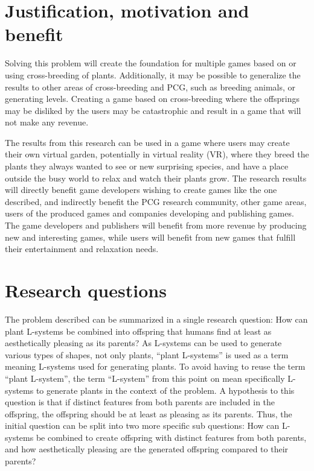 \section{Justification, motivation and benefit}
Solving this problem will create the foundation for multiple games based on or using cross-breeding of plants.
Additionally, it may be possible to generalize the results to other areas of cross-breeding and PCG, such as breeding animals, or generating levels.
Creating a game based on cross-breeding where the offsprings may be disliked by the users may be catastrophic and result in a game that will not make any revenue.

The results from this research can be used in a game where users may create their own virtual garden, potentially in virtual reality (VR), where they breed the plants they always wanted to see or new surprising species, and have a place outside the busy world to relax and watch their plants grow.
The research results will directly benefit game developers wishing to create games like the one described, and indirectly benefit the PCG research community, other game areas, users of the produced games and companies developing and publishing games.
The game developers and publishers will benefit from more revenue by producing new and interesting games, while users will benefit from new games that fulfill their entertainment and relaxation needs.

\section{Research questions}
The problem described can be summarized in a single research question: How can plant L-systems be combined into offspring that humans find at least as aesthetically pleasing as its parents?
As L-systems can be used to generate various types of shapes, not only plants, ``plant L-systems'' is used as a term meaning L-systems used for generating plants.
To avoid having to reuse the term ``plant L-system'', the term ``L-system'' from this point on mean specifically L-systems to generate plants in the context of the problem.
A hypothesis to this question is that if distinct features from both parents are included in the offspring, the offspring should be at least as pleasing as its parents.
Thus, the initial question can be split into two more specific sub questions: How can L-systems be combined to create offspring with distinct features from both parents, and how aesthetically pleasing are the generated offspring compared to their parents?

